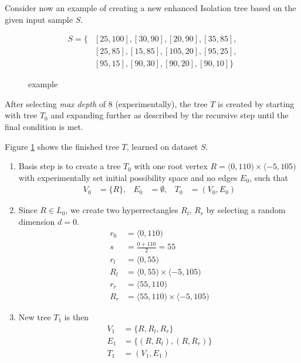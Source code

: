\begin{example}
\label{example:novelty_tree_create}
Consider now an example of creating a new enhanced Isolation tree based on the given input sample $S$.

\begin{align*}
    S = \{&[25,100],[30,90],[20,90],[35,85],\\
    &[25,85],[15,85],[105,20],[95,25], \\
    &[95,15],[90,30],[90,20],[90,10]\}
\end{align*}


\begin{figure}[htbp]
\centering

\caption{example}
\label{fig:example_novelty_gnu}
\end{figure}

After selecting \emph{max depth} of 8 (experimentally), the tree $T$ is created by starting with tree $T_0$ and expanding further as described by the recursive step until the final condition is met.

Figure \ref{fig:example_novelty_gnu} shows the finished tree $T$, learned on dataset $S$.

\begin{enumerate}
    \item Basis step is to create a tree $T_0$ with one root vertex $R = \langle 0,110) \times \langle -5,105)$ with experimentally set initial possibility space and no edges $E_0$, such that
    \begin{align*}
        V_0 &= \{R\},&
        E_0 &= \emptyset,&
        T_0 &= (V_0, E_0)
    \end{align*}
    \item Since $R \in L_0$, we create two hyperrectangles $R_l$, $R_r$ by selecting a random dimension $d=0$.
    \begin{align*}
        r_0 &= \langle 0, 110) \\
        s &= \frac{0 + 110}{2} = 55 \\
        r_l &= \langle 0, 55) \\
        R_l &= \langle 0, 55) \times \langle -5,105) \\
        r_r &= \langle 55, 110) \\
        R_r &= \langle 55, 110) \times \langle -5,105)
    \end{align*}

    \item New tree $T_1$ is then
    \begin{align*}
    V_1 &= \{R, R_l, R_r\} \\
    E_1 &= \{(R, R_l), (R, R_r)\} \\
    T_1 &= (V_1, E_1)
    \end{align*}


\end{enumerate}
\end{example}
